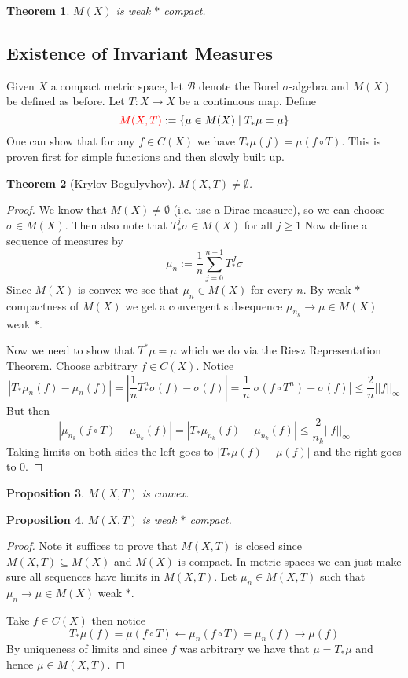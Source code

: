 \documentclass[11pt]{article}
\newcommand{\defeq}{:=}
\newcommand{\abs}[1]{\left|#1\right|}
\newcommand{\norm}[1]{\left|\left|#1\right|\right|}
\newcommand{\relmiddle}[1]{\mathrel{}\middle#1\mathrel{}}
\newcommand{\rmv}{\relmiddle|}
\newcommand{\mdf}[1]{{\color{red} #1}}
\newtheorem{prop}{Proposition}[section]
\newtheorem{theorem}[prop]{Theorem}
\begin{document}
\begin{theorem}
$M(X)$ is weak $\ast$ compact.
\end{theorem}

\subsection{Existence of Invariant Measures}
Given $X$ a compact metric space, let $\mathcal{B}$ denote the Borel $\sigma$-algebra and $M(X)$ be defined as before.
Let $T:X\to X$ be a continuous map.
Define
\[
	\mdf{M(X, T)}\defeq \left\{ \mu\in M(X) \rmv T_\ast \mu = \mu\right\}
\]
One can show that for any $f\in C(X)$ we have $T_\ast\mu(f) = \mu(f\circ T)$.
This is proven first for simple functions and then slowly built up.

\begin{theorem}[Krylov-Bogulyvhov]
$M(X, T)\neq \emptyset$.
\end{theorem}

\begin{proof}
We know that $M(X) \neq \emptyset$ (i.e. use a Dirac measure), so we can choose $\sigma \in M(X)$.
Then also note that $T_\ast^j \sigma\in M(X)$ for all $j \geq 1$
Now define a sequence of measures by
\[
	\mu_n \defeq \frac{1}{n}\sum_{j=0}^{n-1}T_\ast^J \sigma
\]
Since $M(X)$ is convex we see that $\mu_n\in M(X)$ for every $n$.
By weak $\ast$ compactness of $M(X)$ we get a convergent subsequence $\mu_{n_k}\to \mu\in M(X)$ weak $\ast$.

Now we need to show that $T^\ast \mu=\mu$ which we do via the Riesz Representation Theorem.
Choose arbitrary $f\in C(X)$.
Notice 
\[
\abs{T_\ast \mu_n(f) - \mu_n(f)} = \abs{ \frac{1}{n}T_\ast^n\sigma(f) - \sigma(f)} = \frac{1}{n}\abs{\sigma(f \circ T^n) - \sigma(f)} \leq \frac{2}{n}\norm{f}_\infty
\]
But then
\[
\abs{\mu_{n_k}(f \circ T) - \mu_{n_k} (f) } = \abs{T_\ast \mu_{n_k} (f) - \mu_{n_k} (f)} \leq \frac{2}{n_k}\norm{f}_\infty
\]
Taking limits on both sides the left goes to $\abs{T_\ast\mu(f) - \mu(f)}$ and the right goes to $0$.
\end{proof}

\begin{prop}
$M(X, T)$ is convex.
\end{prop}

\begin{prop}
$M(X, T)$ is weak $\ast$ compact.
\end{prop}

\begin{proof}
Note it suffices to prove that $M(X, T)$ is closed since $M(X, T)\subseteq M(X)$ and $M(X)$ is compact.
In metric spaces we can just make sure all sequences have limits in $M(X, T)$.
Let $\mu_n\in M(X, T)$ such that $\mu_n \to \mu\in M(X)$ weak $\ast$.

Take $f\in C(X)$ then notice
\[
	T_\ast\mu(f) = \mu(f\circ T) \leftarrow \mu_n (f\circ T) = \mu_n (f) \to \mu(f)
\]
By uniqueness of limits and since $f$ was arbitrary we have that $\mu = T_\ast \mu$ and hence $\mu\in M(X, T)$.
\end{proof}
\end{document}
